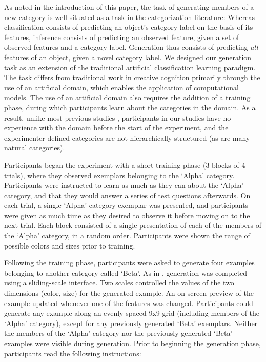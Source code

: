 \documentclass[12pt]{article}
\begin{document}
\begin{flushleft}
As noted in the introduction of this paper, the task of generating members of a
new category is well situated as a task in the categorization
literature: Whereas classification consists of predicting an object's category
label on the basis of its features, inference consists of predicting an observed
feature, given a set of observed features and a category label. Generation thus
consists of predicting {\em all} features of an object, given a novel category
label. We designed our generation task as an
extension of the traditional artificial classification learning paradigm. The
task differs from traditional work in creative cognition primarily through the
use of an artificial domain, which enables the application of computational
models. The use of an artificial domain also requires the addition of a training
phase, during which participants learn about the categories in the domain. As a
result, unlike most previous studies \citep[e.g.,][]{ward1994structured},
participants in our studies have no experience with the domain before the start
of the experiment, and the experimenter-defined categories are not
hierarchically structured (as are many natural categories).

Participants began the experiment with a short training phase (3 blocks of 4
trials), where they observed exemplars belonging to the `Alpha' category.
Participants were instructed to learn as much as they can about the `Alpha'
category, and that they would answer a series of test questions afterwards. On
each trial, a single `Alpha' category exemplar was presented, and participants
were given as much time as they desired to observe it before moving on to the
next trial. Each block consisted of a single presentation of each of the members
of the `Alpha' category, in a random order. Participants were shown the range of
possible colors and sizes prior to training.

Following the training phase, participants were asked to generate four examples
belonging to another category called `Beta'. As in
\citet{jern2013probabilistic}, generation was completed using a sliding-scale
interface. Two scales controlled the values of the two dimensions (color, size)
for the generated example. An on-screen preview of the example updated whenever
one of the features was changed. Participants could generate any example along
an evenly-spaced 9x9 grid (including members of the `Alpha' category), except for
any previously generated `Beta' exemplars. Neither the members of the `Alpha'
category nor the previously generated `Beta' examples were visible during
generation. Prior to beginning the generation phase, participants read the
following instructions:


\end{flushleft}
\end{document}

